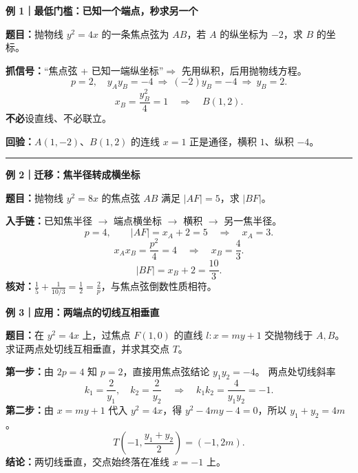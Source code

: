 \clearpage
\begin{examplebox}

\textbf{\textcolor{CExample}{例 1｜最低门槛：已知一个端点，秒求另一个}}\par\smallskip
\textbf{题目：}抛物线 $y^2=4x$ 的一条焦点弦为 $AB$，若 $A$ 的纵坐标为 $-2$，求 $B$ 的坐标。\par\smallskip
\textbf{抓信号：}“焦点弦 + 已知一端纵坐标”$\Rightarrow$ 先用纵积，后用抛物线方程。
\[
 p=2,\quad y_Ay_B=-4
 \ \Longrightarrow\ (-2)y_B=-4
 \ \Longrightarrow\ y_B=2.
\]
\[
 x_B=\frac{y_B^2}{4}=1
 \quad\Longrightarrow\quad \boxed{B(1,2)}.
\]
\textbf{不必}设直线、不必联立。

\par\smallskip\textbf{回验：}$A(1,-2)$、$B(1,2)$ 的连线 $x=1$ 正是通径，横积 $1$、纵积 $-4$。\medskip\hrule\medskip
\textbf{\textcolor{CExample}{例 2｜迁移：焦半径转成横坐标}}\par\smallskip
\textbf{题目：}抛物线 $y^2=8x$ 的焦点弦 $AB$ 满足 $|AF|=5$，求 $|BF|$。\par\smallskip
\textbf{入手链：}已知焦半径 $\to$ 端点横坐标 $\to$ 横积 $\to$ 另一焦半径。
\[
 p=4,\qquad |AF|=x_A+2=5
 \quad\Longrightarrow\quad x_A=3.
\]
\[
 x_Ax_B=\frac{p^2}{4}=4
 \quad\Longrightarrow\quad x_B=\frac43.
\]
\[
 \boxed{|BF|=x_B+2=\frac{10}{3}}.
\]
\textbf{核对：}$\frac1{5}+\frac1{10/3}=\frac12=\frac2p$，与焦点弦倒数性质相符。


\end{examplebox}
\clearpage
\begin{examplebox}

\textbf{\textcolor{CExample}{例 3｜应用：两端点的切线互相垂直}}\par\smallskip
\textbf{题目：}在 $y^2=4x$ 上，过焦点 $F(1,0)$ 的直线
$l:x=my+1$ 交抛物线于 $A,B$。求证两点处切线互相垂直，并求其交点 $T$。\par\smallskip
\textbf{第一步：}由 $2p=4$ 知 $p=2$，直接用焦点弦结论 $y_1y_2=-4$。
两点处切线斜率
\[
 k_1=\frac2{y_1},\quad k_2=\frac2{y_2}
 \quad\Longrightarrow\quad
 \boxed{k_1k_2=\frac4{y_1y_2}=-1}.
\]
\textbf{第二步：}由 $x=my+1$ 代入 $y^2=4x$，得
$y^2-4my-4=0$，所以 $y_1+y_2=4m$。
\[
 \boxed{T\!\left(-1,\frac{y_1+y_2}{2}\right)=(-1,2m)}.
\]
\textbf{结论：}两切线垂直，交点始终落在准线 $x=-1$ 上。


\end{examplebox}
\clearpage
